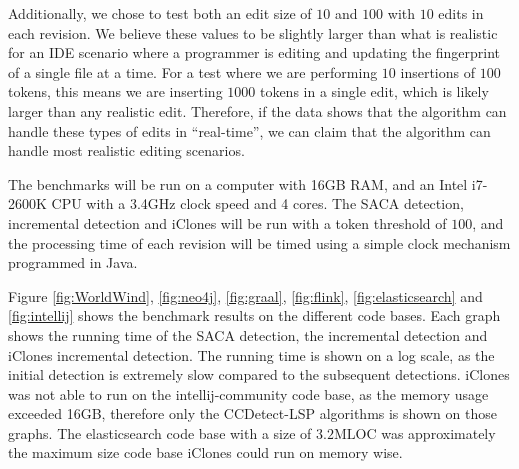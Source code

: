 Additionally, we chose to test both an edit size of $10$ and $100$ with $10$ edits in each
revision. We believe these values to be slightly larger than what is realistic for an IDE
scenario where a programmer is editing and updating the fingerprint of a single file at a
time. For a test where we are performing $10$ insertions of $100$ tokens, this means we
are inserting $1000$ tokens in a single edit, which is likely larger than any realistic
edit. Therefore, if the data shows that the algorithm can handle these types of edits in
``real-time'', we can claim that the algorithm can handle most realistic editing
scenarios.

The benchmarks will be run on a computer with 16GB RAM, and an Intel i7-2600K CPU with a
3.4GHz clock speed and 4 cores. The SACA detection, incremental detection and iClones will
be run with a token threshold of $100$, and the processing time of each revision will be
timed using a simple clock mechanism programmed in Java. 



Figure \ref{fig:WorldWind}, \ref{fig:neo4j}, \ref{fig:graal}, \ref{fig:flink},
\ref{fig:elasticsearch} and \ref{fig:intellij} shows the benchmark results on the
different code bases. Each graph shows the running time of the SACA detection, the
incremental detection and iClones incremental detection. The running time is shown on a
log scale, as the initial detection is extremely slow compared to the subsequent
detections. iClones was not able to run on the intellij-community code base, as the memory
usage exceeded 16GB, therefore only the CCDetect-LSP algorithms is shown on those graphs.
The elasticsearch code base with a size of $3.2\text{MLOC}$ was approximately the maximum
size code base iClones could run on memory wise.


